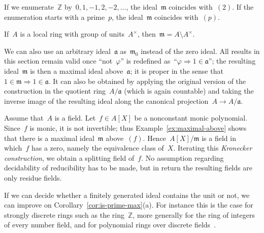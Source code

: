 \documentclass[envcountsect,envcountsame,runningheads]{llncs}
\newcommand{\aaa}{\mathfrak{a}}
\newcommand{\mmm}{\mathfrak{m}}
\newcommand{\ZZ}{\mathbb{Z}}
\renewcommand{\_}{\mathpunct{.}\,}
\begin{document}
\begin{example}If we enumerate~$\ZZ$ by~$0,1,-1,2,-2,\ldots$, the
ideal~$\mmm$ coincides with~$(2)$. If the enumeration starts with a
prime~$p$, the ideal~$\mmm$ coincides with~$(p)$.\end{example}

\begin{example}If~$A$ is a local ring with group of units~$A^\times$, then~$\mmm = A \setminus A^\times$.\end{example}

\begin{example}\label{ex:maximal-above}We can also use an
arbitrary ideal~$\aaa$ as~$\mmm_0$ instead of the zero ideal. All results in
this section remain valid once ``not~$\varphi$'' is redefined
as~``$\varphi \Rightarrow 1\in\aaa$''; the resulting ideal~$\mmm$ is then a
maximal ideal above~$\aaa$; it is proper in the sense that~$1 \in \mmm
\Rightarrow 1 \in \aaa$. It can also be obtained by applying the original
version of the construction in the quotient ring~$A/\aaa$ (which is again
countable) and taking the inverse image of the resulting ideal along the
canonical projection~$A \to A/\aaa$.\end{example}

\begin{example}Assume that~$A$ is a field. Let~$f \in A[X]$ be a nonconstant monic
polynomial. Since~$f$ is monic, it is not invertible; thus
Example~\ref{ex:maximal-above} shows that there is a maximal ideal~$\mmm$
above~$(f)$. Hence~$A[X]/\mmm$ is a field in which~$f$ has a zero, namely the equivalence class of~$X$.
Iterating this \emph{Kronecker construction}, we obtain a splitting field of~$f$. No
assumption regarding decidability of reducibility has to be made, but in return
the resulting fields are only residue fields.\end{example}

If we can decide whether a finitely generated ideal contains the
unit or not, we can improve on Corollary~\ref{cor:is-prime-max}(a). For instance this is the case for
strongly discrete rings such as the ring~$\ZZ$, more generally for the ring of
integers of every number field, and for polynomial rings over discrete
fields~\cite[Theorem~VIII.1.5]{mines-richman-ruitenburg:constructive-algebra}.
\end{document}

